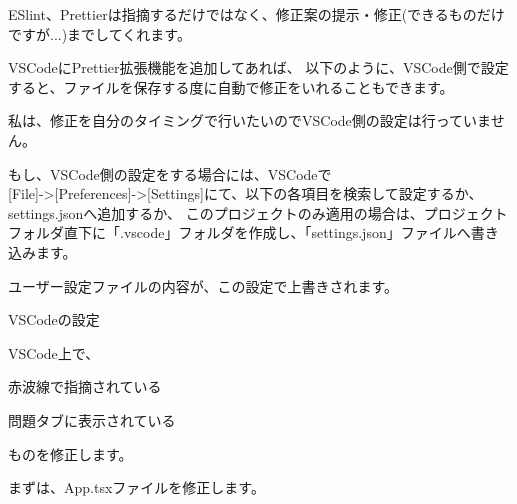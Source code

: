 ESlint、Prettierは指摘するだけではなく、修正案の提示・修正(できるものだけですが...)までしてくれます。

\vspace*{\baselineskip}

VSCodeにPrettier拡張機能を追加してあれば、
以下のように、VSCode側で設定すると、ファイルを保存する度に自動で修正をいれることもできます。

\vspace*{\baselineskip}

私は、修正を自分のタイミングで行いたいのでVSCode側の設定は行っていません。

\vspace*{\baselineskip}

もし、VSCode側の設定をする場合には、VSCodeで\\[0pt]
[File]{-}\textgreater{}[Preferences]{-}\textgreater{}[Settings]にて、以下の各項目を検索して設定するか、settings.jsonへ追加するか、
このプロジェクトのみ適用の場合は、プロジェクトフォルダ直下に「.vscode」フォルダを作成し、「settings.json」ファイルへ書き込みます。

ユーザー設定ファイルの内容が、この設定で上書きされます。

\def\startercodeblockfontsize{}
\begin{starterprogram}[]{VSCodeの設定}\end{starterprogram}

VSCode上で、\\[0pt]

\begin{starteritemize}
\item 赤波線で指摘されている
\item 問題タブに表示されている
\end{starteritemize}

\vspace*{\baselineskip}

ものを修正します。

\vspace*{\baselineskip}

まずは、App.tsxファイルを修正します。

